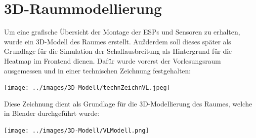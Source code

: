 \section{3D-Raummodellierung}
Um eine grafische Übersicht der Montage der ESPs und Sensoren zu erhalten, wurde ein 3D-Modell des Raumes erstellt.
Außderdem soll dieses später als Grundlage für die Simulation der Schallausbreitung als Hintergrund für die Heatmap im Frontend dienen.
Dafür wurde vorerst der Vorlesungsraum ausgemessen und in einer technischen Zeichnung festgehalten:
\begin{center}
  \texttt{[image: ../images/3D-Modell/technZeichnVL.jpeg]}
\end{center}
Diese Zeichnung dient als Grundlage für die 3D-Modellierung des Raumes, welche in Blender durchgeführt wurde:
\begin{center}
  \texttt{[image: ../images/3D-Modell/VLModell.png]}
\end{center}